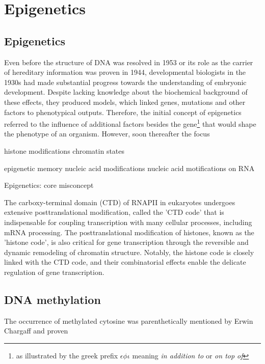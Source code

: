 \chapter{Epigenetics} 
\minitoc
\section{Epigenetics}
\label{chap:i:epigenetics:overview}

Even before the structure of DNA was resolved in 1953\cite{Watson1953} or its role as the carrier of hereditary information was proven in 1944\cite{Avery1944,McCarty1946}, developmental biologists in the 1930s had made substantial progress towards the understanding of embryonic development. Despite lacking knowledge about the biochemical background of these effects, they produced models, which linked genes, mutations and other factors to phenotypical outputs. Therefore, the initial concept of epigenetics referred to the influence of additional factors besides the gene\footnote{as illustrated by the greek prefix $\epsilon\phi\iota$ meaning \emph{in addition to} or \emph{on top of}} that would shape the phenotype of an organism. However, soon thereafter the focus 

histone modifications \cite{Allfrey1964}
chromatin states\cite{Ernst2010}

epigenetic memory\cite{DUrso2014}
nucleic acid modifications \cite{Chen2016a}
nucleic acid motifications on RNA \cite{Wang2014,Roundtree2017}

Epigenetics: core misconcept \cite{Ptashne2013}

The carboxy-terminal domain (CTD) of RNAPII in eukaryotes undergoes extensive posttranslational modification, called the 'CTD code' that is indispensable for coupling transcription with many cellular processes, including mRNA processing. The posttranslational modification of histones, known as the 'histone code', is also critical for gene transcription through the reversible and dynamic remodeling of chromatin structure. Notably, the histone code is closely linked with the CTD code, and their combinatorial effects enable the delicate regulation of gene transcription. \cite{Srivastava2015}

\section{DNA methylation}

The occurrence of methylated cytosine was parenthetically mentioned by Erwin Chargaff\cite{Chargaff1951} and proven \cite{Cohn1951}

